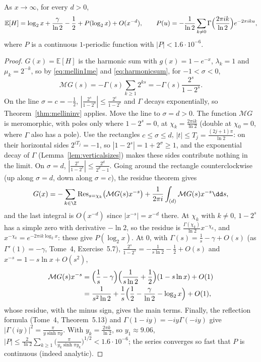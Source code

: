 \begin{theorem}\label{thm:maxgeom}
As $x\to\infty$, for every $d>0$,
\[
\mathbb E[H]=\log_2x+\frac\gamma{\ln2}-\frac12+P(\log_2x)+O(x^{-d}),\qquad P(u)=-\frac1{\ln2}\sum_{k\ne0}\Gamma\Bigl(\frac{2\pi ik}{\ln2}\Bigr)e^{-2\pi iku},
\]
where $P$ is a continuous $1$-periodic function with $|P|<1.6\cdot10^{-6}$.
\end{theorem}
\begin{proof}
$G(x)=\mathbb E[H]$ is the harmonic sum with $g(x)=1-e^{-x}$, $\lambda_k=1$ and $\mu_k=2^{-k}$, so by \eqref{eq:mellin1me} and \eqref{eq:harmonicsum}, for $-1<\sigma<0$,
\[
\mathcal MG(s)=-\Gamma(s)\sum_{k\ge1}2^{ks}=-\Gamma(s)\frac{2^s}{1-2^s}.
\]
On the line $\sigma=c=-\frac12$, $|\frac{2^s}{1-2^s}|\le\frac{2^c}{1-2^c}$ and $\Gamma$ decays exponentially, so Theorem~\ref{thm:mellininv} applies. Move the line to $\sigma=d>0$. The function $\mathcal MG$ is meromorphic, with poles
only where $1-2^s=0$, at $\chi_k=\frac{2\pi ik}{\ln2}$ (double at $\chi_0=0$, where $\Gamma$ also has a pole). Use the rectangles $c\le\sigma\le d$, $|t|\le T_j=\frac{(2j+1)\pi}{\ln2}$: on their horizontal sides $2^{iT_j}=-1$, so
$|1-2^s|=1+2^\sigma\ge1$, and the exponential decay of $\Gamma$ (Lemma~\ref{lem:verticalsizes}) makes these sides contribute nothing in the limit. On $\sigma=d$, $|\frac{2^s}{1-2^s}|\le\frac{2^d}{2^d-1}$. Going around the
rectangle counterclockwise (up along $\sigma=d$, down along $\sigma=c$), the residue theorem gives
\[
G(x)=-\sum_{k\in\Z}\operatorname{Res}_{s=\chi_k}\bigl(\mathcal MG(s)x^{-s}\bigr)+\frac1{2\pi i}\int_{(d)}\mathcal MG(s)x^{-s}\dd s,
\]
and the last integral is $O(x^{-d})$ since $|x^{-s}|=x^{-d}$ there. At $\chi_k$ with $k\ne0$, $1-2^s$ has a simple zero with derivative $-\ln2$, so the residue is $\frac{\Gamma(\chi_k)}{\ln2}x^{-\chi_k}$, and
$x^{-\chi_k}=e^{-2\pi ik\log_2x}$: these give $P(\log_2x)$. At $0$, with $\Gamma(s)=\frac1s-\gamma+O(s)$ (as $\Gamma'(1)=-\gamma$, Tome~4, Exercise~5.7), $\frac{2^s}{1-2^s}=-\frac1{s\ln2}-\frac12+O(s)$ and $x^{-s}=1-s\ln x+O(s^2)$,
\[
\begin{aligned}\mathcal MG(s)x^{-s}&=\Bigl(\frac1s-\gamma\Bigr)\Bigl(\frac1{s\ln2}+\frac12\Bigr)(1-s\ln x)+O(1)\\&=\frac1{s^2\ln2}+\frac1s\Bigl(\frac12-\frac\gamma{\ln2}-\log_2x\Bigr)+O(1),\end{aligned}
\]
whose residue, with the minus sign, gives the main terms. Finally, the reflection formula (Tome~4, Theorem~5.13) and $\Gamma(1-iy)=-iy\Gamma(-iy)$ give $|\Gamma(iy)|^2=\frac\pi{y\sinh\pi y}$. With $y_k=\frac{2\pi k}{\ln2}$, so
$y_1\approx9.06$, $|P|\le\frac2{\ln2}\sum_{k\ge1}\bigl(\frac\pi{y_k\sinh\pi y_k}\bigr)^{1/2}<1.6\cdot10^{-6}$; the series converges so fast that $P$ is continuous (indeed analytic).
\end{proof}

